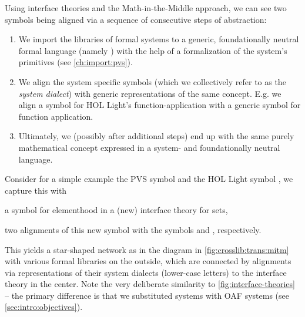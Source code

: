 Using interface theories and the Math-in-the-Middle approach, we can see two symbols being aligned via a sequence of consecutive steps of abstraction:
\begin{enumerate}
	\item We import the libraries of formal systems to a generic, foundationally neutral formal language (namely \ommt) with the help of a formalization of the system's primitives (see \autoref{ch:import:pvs}).
	\item We align the system specific symbols (which we collectively refer to as the \emph{system dialect})\label{lbl:dialect}
		with generic representations of the same concept. E.g. we align a symbol for HOL Light's function-application with a generic symbol for function application.
	\item Ultimately, we (possibly after additional steps) end up with the same purely mathematical concept
		expressed in a system- and foundationally neutral language.
\end{enumerate}

Consider for a simple example the PVS symbol  and the HOL Light symbol , we capture this with
\begin{compactitem}
 \item a symbol for elementhood in a (new) interface theory for sets,
 \item two alignments of this new symbol with the symbols  and , respectively.
\end{compactitem}

This yields a star-shaped network as in the diagram in \autoref{fig:crosslib:trans:mitm} with various formal libraries on the outside, which are connected by alignments via representations of their system dialects (lower-case letters) to the interface theory in the center. Note the very deliberate similarity to \autoref{fig:interface-theories} -- the primary difference is that we substituted \ODK systems with OAF systems (see \autoref{sec:intro:objectives}).


